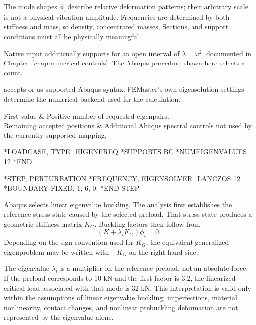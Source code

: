 The mode shapes \(\phi_i\) describe relative deformation patterns; their arbitrary scale is not a physical vibration amplitude. Frequencies are determined by both stiffness and mass, so density, concentrated masses, Sections, and support conditions must all be physically meaningful.

Native input additionally supports  for an open interval of \(\lambda=\omega^2\), documented in Chapter~\ref{chap:numerical-controls}. The Abaqus procedure shown here selects a count.

 accepts  or  as supported Abaqus syntax. FEMaster's own eigensolution settings determine the numerical backend used for the calculation.

\begin{keyworddata}
First value & Positive number of requested eigenpairs. \\
Remaining accepted positions & Additional Abaqus spectral controls not used by the currently supported mapping. \\
\end{keyworddata}

\exampleheading

\begin{dialectexamples}
\begin{femasterdeck}
*LOADCASE, TYPE=EIGENFREQ
*SUPPORTS
BC
*NUMEIGENVALUES
12
*END
\end{femasterdeck}
\begin{abaqusdeck}
*STEP, PERTURBATION
*FREQUENCY, EIGENSOLVER=LANCZOS
12
*BOUNDARY
FIXED, 1, 6, 0.
*END STEP
\end{abaqusdeck}
\end{dialectexamples}


Abaqus  selects linear eigenvalue buckling. The analysis first establishes the reference stress state caused by the selected preload. That stress state produces a geometric stiffness matrix \(K_G\). Buckling factors then follow from
\[
\left(K+\lambda_iK_G\right)\phi_i=0.
\]
Depending on the sign convention used for \(K_G\), the equivalent generalized eigenproblem may be written with \(-K_G\) on the right-hand side.

The eigenvalue \(\lambda_i\) is a multiplier on the reference preload, not an absolute force. If the preload corresponds to 10 kN and the first factor is 3.2, the linearized critical load associated with that mode is 32 kN. This interpretation is valid only within the assumptions of linear eigenvalue buckling; imperfections, material nonlinearity, contact changes, and nonlinear prebuckling deformation are not represented by the eigenvalue alone.

